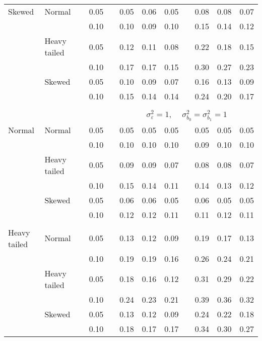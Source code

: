 \begin{table}[ht]
\begin{scriptsize}
\begin{center}
\begin{tabular}{ll p{.1cm} c p{.1cm} rrr p{.1cm} rrr}
Skewed       & Normal       && 0.05 &&  0.05 & 0.06 & 0.05 && 0.08 & 0.08 & 0.07 \\ 
             &              && 0.10 &&  0.10 & 0.09 & 0.10 && 0.15 & 0.14 & 0.12 \\ 
             & Heavy tailed && 0.05 &&  0.12 & 0.11 & 0.08 && 0.22 & 0.18 & 0.15 \\ 
             &              && 0.10 &&  0.17 & 0.17 & 0.15 && 0.30 & 0.27 & 0.23 \\ 
             & Skewed       && 0.05 &&  0.10 & 0.09 & 0.07 && 0.16 & 0.13 & 0.09 \\ 
             &              && 0.10 &&  0.15 & 0.14 & 0.14 && 0.24 & 0.20 & 0.17 \\ 

&&&&&&&&&&&\\
& && && \multicolumn{7}{c}{$\sigma_{\varepsilon}^2 = 1$, \ \ $\sigma_{b_0}^2 = \sigma_{b_1}^2 = 1$} \\ \cline{6-12}
\rowcolor{gray!20}Normal       & Normal       && 0.05 &&  0.05 & 0.05 & 0.05 && 0.05 & 0.05 & 0.05 \\ 
\rowcolor{gray!20}             &              && 0.10 &&  0.10 & 0.10 & 0.10 && 0.09 & 0.10 & 0.10 \\ 
\rowcolor{gray!20}             & Heavy tailed && 0.05 &&  0.09 & 0.09 & 0.07 && 0.08 & 0.08 & 0.07 \\ 
\rowcolor{gray!20}             &              && 0.10 &&  0.15 & 0.14 & 0.11 && 0.14 & 0.13 & 0.12 \\ 
\rowcolor{gray!20}             & Skewed       && 0.05 &&  0.06 & 0.06 & 0.05 && 0.06 & 0.05 & 0.05 \\ 
\rowcolor{gray!20}             &              && 0.10 &&  0.12 & 0.12 & 0.11 && 0.11 & 0.12 & 0.11 \\ 
             &&&&&&&&&&&\\
Heavy tailed & Normal       && 0.05 &&  0.13 & 0.12 & 0.09 && 0.19 & 0.17 & 0.13 \\ 
             &              && 0.10 &&  0.19 & 0.19 & 0.16 && 0.26 & 0.24 & 0.21 \\ 
             & Heavy tailed && 0.05 &&  0.18 & 0.16 & 0.12 && 0.31 & 0.29 & 0.22 \\ 
             &              && 0.10 &&  0.24 & 0.23 & 0.21 && 0.39 & 0.36 & 0.32 \\ 
             & Skewed       && 0.05 &&  0.13 & 0.12 & 0.09 && 0.24 & 0.22 & 0.18 \\ 
             &              && 0.10 &&  0.18 & 0.17 & 0.17 && 0.34 & 0.30 & 0.27 \\

\end{tabular}
\end{center}
\end{scriptsize}
\end{table}
